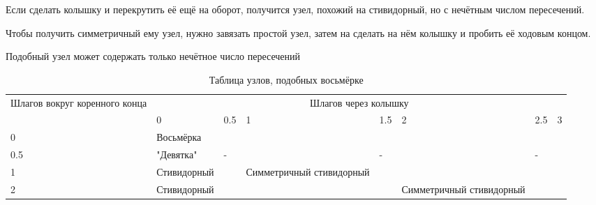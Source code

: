 Если сделать колышку и перекрутить её ещё на оборот, получится узел, похожий на стивидорный, но с нечётным числом пересечений.

Чтобы получить симметричный ему узел, нужно завязать простой узел, затем на сделать на нём колышку и пробить её ходовым концом.

Подобный узел может содержать только нечётное число пересечений

\begin{table}
\caption{Таблица узлов, подобных восьмёрке}
\begin{center}
\begin{tabular}{|p{3cm}|p{2cm}|p{2cm}|p{2cm}|p{2cm}|p{2cm}|p{2cm}|p{2cm}|}
\hline
\multirow{2}{*}{Шлагов вокруг коренного конца} & \multicolumn{7}{c|}{Шлагов через колышку} \\
\cline{2-8}
& 0 & 0.5 & 1 & 1.5 & 2 & 2.5 & 3 \\
\hline
0 & Восьмёрка & & & & & &  \\
\hline
0.5 & "Девятка" & - & & - & & - &  \\
\hline
1 & Стивидорный & & Симметричный стивидорный& & & &  \\
\hline
2 & Стивидорный & & & & Симметричный стивидорный & &  \\
\hline
\end{tabular}
\end{center}
\end{table}